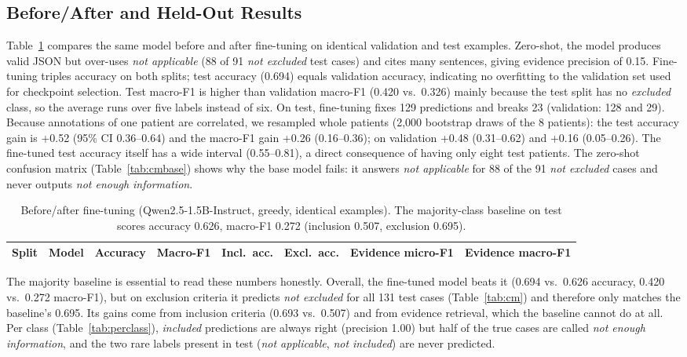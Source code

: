 \documentclass[conference]{IEEEtran}
\begin{document}
\subsection{Before/After and Held-Out Results}
Table~\ref{tab:main} compares the same model before and after fine-tuning on identical validation and test examples. Zero-shot, the model produces valid JSON but over-uses \emph{not applicable} (88 of 91 \emph{not excluded} test cases) and cites many sentences, giving evidence precision of 0.15. Fine-tuning triples accuracy on both splits; test accuracy (0.694) equals validation accuracy, indicating no overfitting to the validation set used for checkpoint selection. Test macro-F1 is higher than validation macro-F1 (0.420 vs.\ 0.326) mainly because the test split has no \emph{excluded} class, so the average runs over five labels instead of six. On test, fine-tuning fixes 129 predictions and breaks 23 (validation: 128 and 29). Because annotations of one patient are correlated, we resampled whole patients (2,000 bootstrap draws of the 8 patients): the test accuracy gain is +0.52 (95\% CI 0.36--0.64) and the macro-F1 gain +0.26 (0.16--0.36); on validation +0.48 (0.31--0.62) and +0.16 (0.05--0.26). The fine-tuned test accuracy itself has a wide interval (0.55--0.81), a direct consequence of having only eight test patients. The zero-shot confusion matrix (Table~\ref{tab:cmbase}) shows why the base model fails: it answers \emph{not applicable} for 88 of the 91 \emph{not excluded} cases and never outputs \emph{not enough information}.

\begin{table}[t]
\centering
\caption{Before/after fine-tuning (Qwen2.5-1.5B-Instruct, greedy, identical examples). The majority-class baseline on test scores accuracy 0.626, macro-F1 0.272 (inclusion 0.507, exclusion 0.695).}
\label{tab:main}
\begin{tabular}{llcccccc}
\toprule
Split & Model & Accuracy & Macro-F1 & Incl.\ acc. & Excl.\ acc. & Evidence micro-F1 & Evidence macro-F1 \\
\midrule

\bottomrule
\end{tabular}
\end{table}

The majority baseline is essential to read these numbers honestly. Overall, the fine-tuned model beats it (0.694 vs.\ 0.626 accuracy, 0.420 vs.\ 0.272 macro-F1), but on exclusion criteria it predicts \emph{not excluded} for all 131 test cases (Table~\ref{tab:cm}) and therefore only matches the baseline's 0.695. Its gains come from inclusion criteria (0.693 vs.\ 0.507) and from evidence retrieval, which the baseline cannot do at all. Per class (Table~\ref{tab:perclass}), \emph{included} predictions are always right (precision 1.00) but half of the true cases are called \emph{not enough information}, and the two rare labels present in test (\emph{not applicable}, \emph{not included}) are never predicted.
\end{document}
